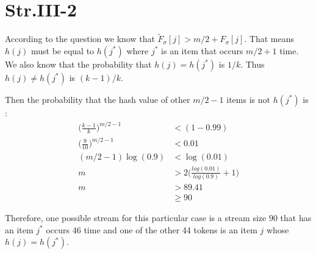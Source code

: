 
\section*{Str.III-2}

According to the question we know that $ \widetilde{F}_{\sigma} [j]  > m/2 + F_{\sigma}[j]$. That means $h(j)$ must be equal to $h(j^*)$ where $j^*$ is an item that occurs $m/2+1$ time. We also know that the probability that $h(j) = h(j^*)$ is $1/k$.
Thus $h(j) \neq h(j^*)$ is $(k-1)/k$.

Then the probability that the hash value of other $m/2-1$ items is not $h(j^*)$ is :
\begin{align*}
\big(\frac{k-1}{k}\big)^{m/2-1} &< (1-0.99) \\
\big(\frac{9}{10})^{m/2-1} &< 0.01 \\
(m/2-1)\log (0.9)   &< \log (0.01) \\
m &> 2\Bigg( \frac{ log(0.01)}{log(0.9)} + 1  \Bigg) \\
m &> 89.41 \\
& \ge 90
\end{align*}

Therefore, one possible stream for this particular case is a stream size $90$ that has an item $j^*$ occurs 46 time and one of the other 44 tokens is an item $j$ whose $h(j) = h(j^*)$.